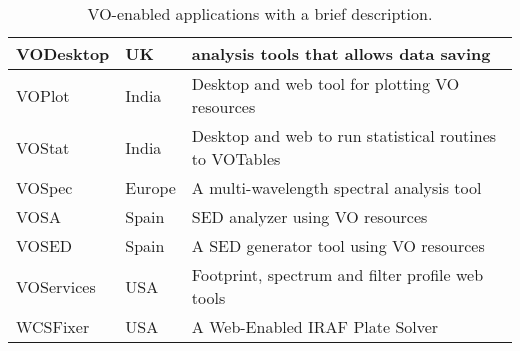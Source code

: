 \begin{table}[ht!]
\begin{tabular}{|l|l|l|}
  \hline								 
  VODesktop & UK & analysis tools that allows data saving \\
  \hline								
  VOPlot & India & Desktop and web tool for plotting VO resources \\
  \hline 
  VOStat & India & Desktop and web to run statistical routines to VOTables \\
  \hline 
  VOSpec & Europe & A multi-wavelength spectral analysis tool\\
  \hline								 
  VOSA & Spain & SED analyzer using VO resources \\
  \hline								 
  VOSED & Spain & A SED generator tool using VO resources \\
  \hline								 
  VOServices & USA & Footprint, spectrum and filter profile web tools\\ 
  \hline 
  WCSFixer & USA & A Web-Enabled IRAF Plate Solver \\
	\hline		
	\end{tabular}
	\caption{VO-enabled applications with a brief
description.}
	\label{table:app}
\end{table}


